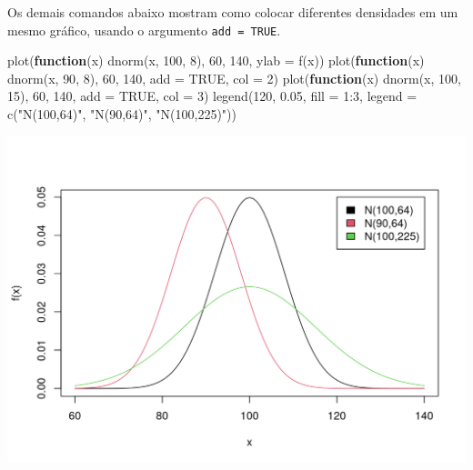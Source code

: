 \documentclass[
  10pt,
  a4paper]{book}
\newenvironment{Shaded}{\begin{snugshade}}{\end{snugshade}}
\newcommand{\AttributeTok}[1]{\textcolor[rgb]{0.77,0.63,0.00}{#1}}
\newcommand{\ConstantTok}[1]{\textcolor[rgb]{0.00,0.00,0.00}{#1}}
\newcommand{\ControlFlowTok}[1]{\textcolor[rgb]{0.13,0.29,0.53}{\textbf{#1}}}
\newcommand{\DecValTok}[1]{\textcolor[rgb]{0.00,0.00,0.81}{#1}}
\newcommand{\FloatTok}[1]{\textcolor[rgb]{0.00,0.00,0.81}{#1}}
\newcommand{\FunctionTok}[1]{\textcolor[rgb]{0.00,0.00,0.00}{#1}}
\newcommand{\NormalTok}[1]{#1}
\newcommand{\SpecialCharTok}[1]{\textcolor[rgb]{0.00,0.00,0.00}{#1}}
\newcommand{\StringTok}[1]{\textcolor[rgb]{0.31,0.60,0.02}{#1}}
\begin{document}
Os demais comandos abaixo mostram como colocar diferentes densidades em um
mesmo gráfico, usando o argumento \texttt{add\ =\ TRUE}.

\begin{Shaded}
\begin{Highlighting}[]
\FunctionTok{plot}\NormalTok{(}\ControlFlowTok{function}\NormalTok{(x) }\FunctionTok{dnorm}\NormalTok{(x, }\DecValTok{100}\NormalTok{, }\DecValTok{8}\NormalTok{), }\DecValTok{60}\NormalTok{, }\DecValTok{140}\NormalTok{, }\AttributeTok{ylab =} \StringTok{\textquotesingle{}f(x)\textquotesingle{}}\NormalTok{)}
\FunctionTok{plot}\NormalTok{(}\ControlFlowTok{function}\NormalTok{(x) }\FunctionTok{dnorm}\NormalTok{(x, }\DecValTok{90}\NormalTok{, }\DecValTok{8}\NormalTok{), }\DecValTok{60}\NormalTok{, }\DecValTok{140}\NormalTok{, }\AttributeTok{add =} \ConstantTok{TRUE}\NormalTok{, }\AttributeTok{col =} \DecValTok{2}\NormalTok{)}
\FunctionTok{plot}\NormalTok{(}\ControlFlowTok{function}\NormalTok{(x) }\FunctionTok{dnorm}\NormalTok{(x, }\DecValTok{100}\NormalTok{, }\DecValTok{15}\NormalTok{), }\DecValTok{60}\NormalTok{, }\DecValTok{140}\NormalTok{, }\AttributeTok{add =} \ConstantTok{TRUE}\NormalTok{, }\AttributeTok{col =} \DecValTok{3}\NormalTok{)}
\FunctionTok{legend}\NormalTok{(}\DecValTok{120}\NormalTok{, }\FloatTok{0.05}\NormalTok{, }\AttributeTok{fill =} \DecValTok{1}\SpecialCharTok{:}\DecValTok{3}\NormalTok{,}
       \AttributeTok{legend =} \FunctionTok{c}\NormalTok{(}\StringTok{"N(100,64)"}\NormalTok{, }\StringTok{"N(90,64)"}\NormalTok{, }\StringTok{"N(100,225)"}\NormalTok{))}
\end{Highlighting}
\end{Shaded}

\begin{center}\includegraphics{figures/unnamed-chunk-348-1} \end{center}
\end{document}
